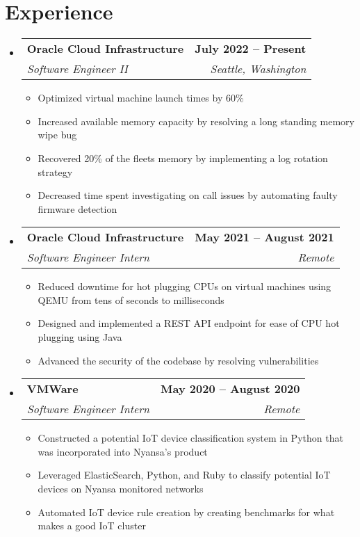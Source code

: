 \documentclass[letterpaper,11pt]{article}
\makeatletter
\newcommand{\resumeItem}[1]{
  \item\small{
    {#1 \vspace{-2pt}}
  }
}
\newcommand{\resumeSubheading}[4]{
  \vspace{-2pt}\item
    \begin{tabular*}{1.0\textwidth}[t]{l@{\extracolsep{\fill}}r}
      \textbf{#1} & \textbf{\small #2} \\
      \textit{\small#3} & \textit{\small #4} \\
    \end{tabular*}\vspace{-7pt}
}
\newcommand{\resumeSubHeadingListStart}{\begin{itemize}[leftmargin=0.0in, label={}]}
\newcommand{\resumeSubHeadingListEnd}{\end{itemize}}
\newcommand{\resumeItemListStart}{\begin{itemize}}
\newcommand{\resumeItemListEnd}{\end{itemize}\vspace{-5pt}}
\makeatother
\begin{document}
\section{Experience}
  \resumeSubHeadingListStart

    \resumeSubheading
      {Oracle Cloud Infrastructure}{July 2022 -- Present}
      {Software Engineer II}{Seattle, Washington}
      \resumeItemListStart
        \resumeItem{Optimized virtual machine launch times by 60\%}
        \resumeItem{Increased available memory capacity by resolving a long standing memory wipe bug}
        \resumeItem{Recovered 20\% of the fleets memory by implementing a log rotation strategy}
        \resumeItem{Decreased time spent investigating on call issues by automating faulty firmware detection}
      \resumeItemListEnd

    \resumeSubheading
      {Oracle Cloud Infrastructure}{May 2021 -- August 2021}
      {Software Engineer Intern}{Remote}
      \resumeItemListStart
        \resumeItem{Reduced downtime for hot plugging CPUs on virtual machines using QEMU from tens of seconds to milliseconds}
        \resumeItem{Designed and implemented  a REST API endpoint for ease of CPU hot plugging using Java}
        \resumeItem{Advanced the security of the codebase by resolving vulnerabilities}
    \resumeItemListEnd

    \resumeSubheading
      {VMWare}{May 2020 -- August 2020}
      {Software Engineer Intern}{Remote}
      \resumeItemListStart
        \resumeItem{Constructed a potential IoT device classification system in Python that was incorporated into Nyansa’s product}
        \resumeItem{Leveraged ElasticSearch, Python, and Ruby to classify potential IoT devices on Nyansa monitored networks}
        \resumeItem{Automated IoT device rule creation by creating benchmarks for what makes a good IoT cluster}
    \resumeItemListEnd
    
  \resumeSubHeadingListEnd
\vspace{-16pt}

\end{document}
